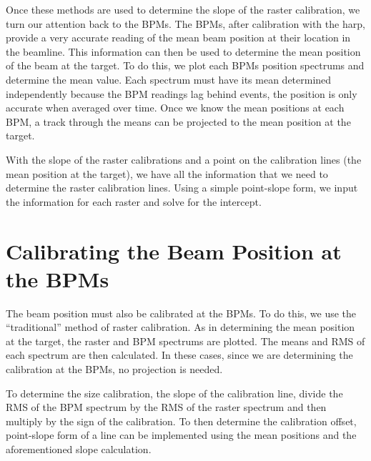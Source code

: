 Once these methods are used to determine the slope of the raster calibration, we turn our attention back to the BPMs. The BPMs, after calibration with the harp, provide a very accurate reading of the mean beam position at their location in the beamline. This information can then be used to determine the mean position of the beam at the target. To do this, we plot each BPMs position spectrums and determine the mean value. Each spectrum must have its mean determined independently because the BPM readings lag behind events, the position is only accurate when averaged over time. Once we know the mean positions at each BPM, a track through the means can be projected to the mean position at the target.

With the slope of the raster calibrations and a point on the calibration lines (the mean position at the target), we have all the information that we need to determine the raster calibration lines. Using a simple point-slope form, we input the information for each raster and solve for the intercept.

\section{Calibrating the Beam Position at the BPMs}

The beam position must also be calibrated at the BPMs. To do this, we use the ``traditional'' method of raster calibration. As in determining the mean position at the target, the raster and BPM spectrums are plotted. The means and RMS of each spectrum are then calculated. In these cases, since we are determining the calibration at the BPMs, no projection is needed.

To determine the size calibration, the slope of the calibration line, divide the RMS of the BPM spectrum by the RMS of the raster spectrum and then multiply by the sign of the calibration. To then determine the calibration offset, point-slope form of a line can be implemented using the mean positions and the aforementioned slope calculation.\cite{Barak}